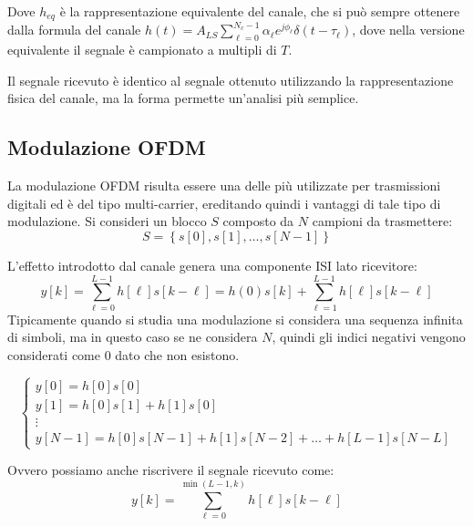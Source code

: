 Dove $h_{eq}$ è la rappresentazione equivalente del canale, che si può sempre ottenere dalla formula del canale $ h(t) = A_{LS} \sum_{\ell=0}^{N_c-1} \alpha_{\ell} e^{j\phi_{\ell}} \delta(t - \tau_{\ell})$, dove nella versione equivalente il segnale è campionato a multipli di $T$.

Il segnale ricevuto è identico al segnale ottenuto utilizzando la rappresentazione fisica del canale, ma la forma permette un'analisi più semplice.


\subsection*{Modulazione OFDM}

La modulazione OFDM risulta essere una delle più utilizzate per trasmissioni digitali ed è del tipo multi-carrier, ereditando quindi i vantaggi di tale tipo di modulazione.
Si consideri un blocco $S$ composto da $N$ campioni da trasmettere:
\[
  S = \left\{s\left[0\right], s\left[1\right], \ldots, s\left[N-1\right]\right\}
\]

L'effetto introdotto dal canale genera una componente ISI lato ricevitore:
\[
  y\left[k\right] = \sum_{\ell=0}^{L-1} h\left[\ell\right] s\left[k - \ell\right] = h(0)s\left[k\right] + \sum_{\ell=1}^{L-1} h\left[\ell\right] s\left[k - \ell\right]
\]
Tipicamente quando si studia una modulazione si considera una sequenza infinita di simboli, ma in questo caso se ne considera $N$, quindi gli indici negativi vengono considerati come 0 dato che non esistono.


\[
    \begin{cases}
        y[0] = h[0]s[0] \\
        y[1] = h[0]s[1] + h[1]s[0] \\
        \vdots \\
        y[N-1] = h[0]s[N-1] + h[1]s[N-2] + \ldots + h[L-1]s[N-L]
    \end{cases}
\]

Ovvero possiamo anche riscrivere il segnale ricevuto come:
\[
y[k] = \sum_{\ell=0}^{\min(L-1, k)} h[\ell] s[k-\ell]
\]


